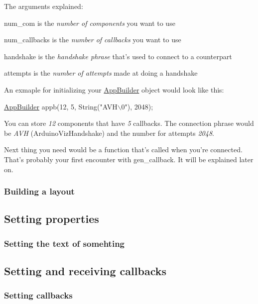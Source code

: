 The arguments explained\+:
\begin{DoxyItemize}
\item {\ttfamily num\+\_\+com} is the {\itshape number of components} you want to use
\item {\ttfamily num\+\_\+callbacks} is the {\itshape number of callbacks} you want to use
\item {\ttfamily handshake} is the {\itshape handshake phrase} that's used to connect to a counterpart
\item {\ttfamily attempts} is the {\itshape number of attempts} made at doing a handshake
\end{DoxyItemize}

An exmaple for initializing your \hyperlink{class_app_builder}{App\+Builder} object would look like this\+:


\begin{DoxyCode}
\hyperlink{class_app_builder}{AppBuilder} appb(12, 5, String(\textcolor{stringliteral}{"AVH\(\backslash\)0"}), 2048);
\end{DoxyCode}


You can store {\itshape 12} components that have {\itshape 5} callbacks. The connection phrase would be {\itshape A\+V\+H} (Arduino\+Viz\+Handshake) and the number for attempts {\itshape 2048}.

Next thing you need would be a function that's called when you're connected. That's probably your first encounter with gen\+\_\+callback. It will be explained later on.

\subsubsection*{Building a layout}

\subsection*{Setting properties}

\subsubsection*{Setting the text of somehting}

\subsection*{Setting and receiving callbacks}

\subsubsection*{Setting callbacks}


